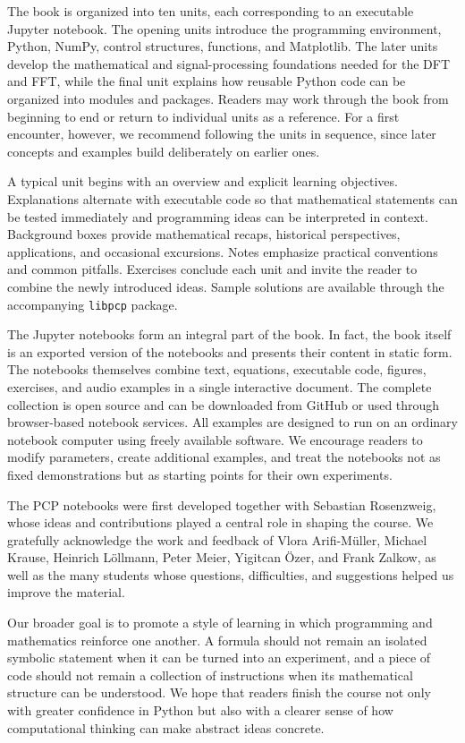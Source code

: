 {The book is organized into ten units, each corresponding to an executable Jupyter notebook. The opening units introduce the programming environment, Python, NumPy, control structures, functions, and Matplotlib. The later units develop the mathematical and signal-processing foundations needed for the DFT and FFT, while the final unit explains how reusable Python code can be organized into modules and packages. Readers may work through the book from beginning to end or return to individual units as a reference. For a first encounter, however, we recommend following the units in sequence, since later concepts and examples build deliberately on earlier ones.

A typical unit begins with an overview and explicit learning objectives. Explanations alternate with executable code so that mathematical statements can be tested immediately and programming ideas can be interpreted in context. Background boxes provide mathematical recaps, \mbox{historical} perspectives, applications, and occasional excursions. Notes emphasize practical conventions and common pitfalls. Exercises conclude each unit and invite the reader to combine the newly introduced ideas. Sample solutions are available through the accompanying \texttt{libpcp} package.

The Jupyter notebooks form an integral part of the book. In fact, the book itself is an exported version of the notebooks and presents their content in static form. The notebooks themselves combine text, equations, executable code, figures, exercises, and audio examples in a single interactive document. The complete collection is open source and can be downloaded from GitHub or used through browser-based notebook services. All examples are designed to run on an ordinary notebook computer using freely available software. We encourage readers to modify parameters, create additional examples, and treat the notebooks not as fixed demonstrations but as starting points for their own experiments.

The PCP notebooks were first developed together with Sebastian Rosenzweig, whose ideas and contributions played a central role in shaping the course. We gratefully acknowledge the work and feedback of Vlora Arifi-Müller, Michael Krause, Heinrich Löllmann, Peter Meier, Yigitcan Özer, and Frank Zalkow, as well as the many students whose questions, difficulties, and suggestions helped us improve the material.

Our broader goal is to promote a style of learning in which programming and mathematics reinforce one another. A formula should not remain an isolated symbolic statement when it can be turned into an experiment, and a piece of code should not remain a collection of instructions when its mathematical structure can be understood. We hope that readers finish the course not only with greater confidence in Python but also with a clearer sense of how computational thinking can make abstract ideas concrete.

}
